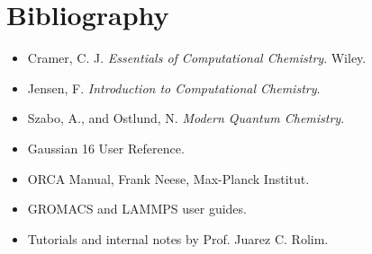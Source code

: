 
\chapter*{Bibliography}

\begin{itemize}
    \item Cramer, C. J. \textit{Essentials of Computational Chemistry}. Wiley.
    \item Jensen, F. \textit{Introduction to Computational Chemistry}.
    \item Szabo, A., and Ostlund, N. \textit{Modern Quantum Chemistry}.
    \item Gaussian 16 User Reference.
    \item ORCA Manual, Frank Neese, Max-Planck Institut.
    \item GROMACS and LAMMPS user guides.
    \item Tutorials and internal notes by Prof. Juarez C. Rolim.
\end{itemize}

